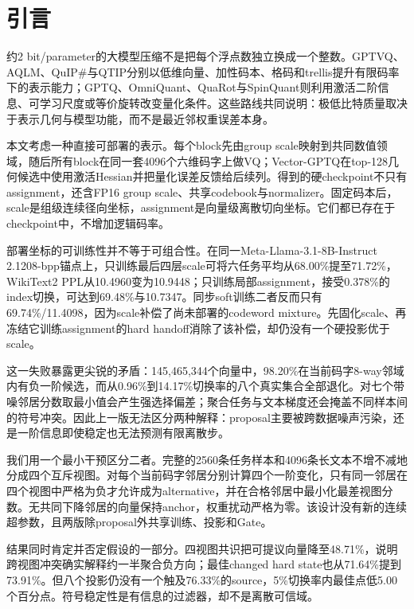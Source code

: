 \section{引言}

约2 bit/parameter的大模型压缩不是把每个浮点数独立换成一个整数。GPTVQ、AQLM、QuIP\#与QTIP分别以低维向量、加性码本、格码和trellis提升有限码率下的表示能力\cite{gptvq,aqlm,quipsharp,qtip}；GPTQ、OmniQuant、QuaRot与SpinQuant则利用激活二阶信息、可学习尺度或等价旋转改变量化条件\cite{gptq,omniquant,quarot,spinquant}。这些路线共同说明：极低比特质量取决于表示几何与模型功能，而不是最近邻权重误差本身。

本文考虑一种直接可部署的表示。每个block先由group scale映射到共同数值领域，随后所有block在同一套4096个六维码字上做VQ；Vector-GPTQ在top-128几何候选中使用激活Hessian并把量化误差反馈给后续列。得到的硬checkpoint不只有assignment，还含FP16 group scale、共享codebook与normalizer。固定码本后，scale是组级连续径向坐标，assignment是向量级离散切向坐标。它们都已存在于checkpoint中，不增加逻辑码率。

部署坐标的可训练性并不等于可组合性。在同一Meta-Llama-3.1-8B-Instruct 2.1208-bpp锚点上，只训练最后四层scale可将六任务平均从68.00\%提至71.72\%，WikiText2 PPL从10.4960变为10.9448；只训练局部assignment，接受0.378\%的index切换，可达到69.48\%与10.7347。同步soft训练二者反而只有69.74\%/11.4098，因为scale补偿了尚未部署的codeword mixture。先固化scale、再冻结它训练assignment的hard handoff消除了该补偿，却仍没有一个硬投影优于scale。

这一失败暴露更尖锐的矛盾：145,465,344个向量中，98.20\%在当前码字8-way邻域内有负一阶候选，而从0.96\%到14.17\%切换率的八个真实集合全部退化。对七个带噪邻居分数取最小值会产生强选择偏差；聚合任务与文本梯度还会掩盖不同样本间的符号冲突。因此上一版无法区分两种解释：proposal主要被跨数据噪声污染，还是一阶信息即使稳定也无法预测有限离散步。

我们用一个最小干预区分二者。完整的2560条任务样本和4096条长文本不增不减地分成四个互斥视图。对每个当前码字邻居分别计算四个一阶变化，只有同一邻居在四个视图中严格为负才允许成为alternative，并在合格邻居中最小化最差视图分数。无共同下降邻居的向量保持anchor，权重扰动严格为零。该设计没有新的连续超参数，且两版除proposal外共享训练、投影和Gate。

结果同时肯定并否定假设的一部分。四视图共识把可提议向量降至48.71\%，说明跨视图冲突确实解释约一半聚合负方向；最佳changed hard state也从71.64\%提到73.91\%。但八个投影仍没有一个触及76.33\%的source，5\%切换率内最佳点低5.00个百分点。符号稳定性是有信息的过滤器，却不是离散可信域。

